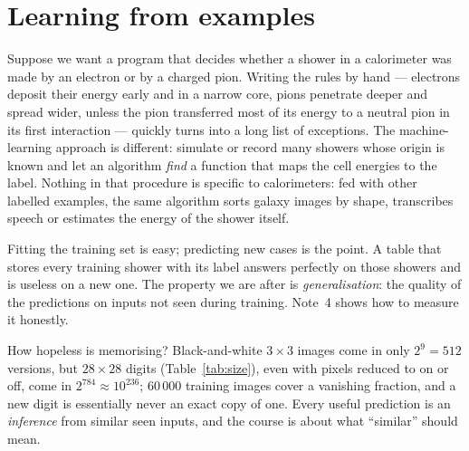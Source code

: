 \documentclass[11pt]{article}
\begin{document}

\section{Learning from examples}

Suppose we want a program that decides whether a shower in a calorimeter was made by an electron or by a charged
pion. Writing the rules by hand --- electrons deposit their energy early and in a narrow core, pions penetrate deeper
and spread wider, unless the pion transferred most of its energy to a neutral pion in its first interaction ---
quickly turns into a long list of exceptions. The machine-learning approach is different: simulate or record many
showers whose origin is known and let an algorithm \emph{find} a function that maps the cell energies to the label.
Nothing in that procedure is specific to calorimeters: fed with other labelled examples, the same algorithm sorts
galaxy images by shape, transcribes speech or estimates the energy of the shower itself.

\begin{keyidea}
Fitting the training set is easy; predicting new cases is the point. A table that stores every training shower with
its label answers perfectly on those showers and is useless on a new one. The property we are after is
\emph{generalisation}: the quality of the predictions on inputs not seen during training. Note~4 shows how to
measure it honestly.
\end{keyidea}

How hopeless is memorising? Black-and-white $3 \times 3$ images come in only $2^9 = 512$ versions, but $28 \times 28$
digits (Table~\ref{tab:size}), even with pixels reduced to on or off, come in $2^{784} \approx 10^{236}$; $60\,000$
training images cover a vanishing fraction, and a new digit is essentially never an exact copy of one. Every useful
prediction is an \emph{inference} from similar seen inputs, and the course is about what ``similar'' should mean.
\end{document}
